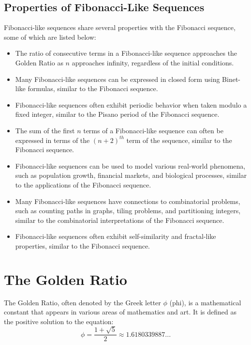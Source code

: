 \documentclass[openany]{book}
\begin{document}
\subsection{Properties of Fibonacci-Like Sequences}
Fibonacci-like sequences share several properties with the Fibonacci sequence, some of which are listed below:
\begin{itemize}
    \item The ratio of consecutive terms in a Fibonacci-like sequence approaches the Golden Ratio as $n$ approaches infinity, regardless of the initial conditions.
    \item Many Fibonacci-like sequences can be expressed in closed form using Binet-like formulas, similar to the Fibonacci sequence.
    \item Fibonacci-like sequences often exhibit periodic behavior when taken modulo a fixed integer, similar to the Pisano period of the Fibonacci sequence.
    \item The sum of the first $n$ terms of a Fibonacci-like sequence can often be expressed in terms of the $(n+2)^{th}$ term of the sequence, similar to the Fibonacci sequence.
    \item Fibonacci-like sequences can be used to model various real-world phenomena, such as population growth, financial markets, and biological processes, similar to the applications of the Fibonacci sequence.
    \item Many Fibonacci-like sequences have connections to combinatorial problems, such as counting paths in graphs, tiling problems, and partitioning integers, similar to the combinatorial interpretations of the Fibonacci sequence.
    \item Fibonacci-like sequences often exhibit self-similarity and fractal-like properties, similar to the Fibonacci sequence.
\end{itemize}



\section{The Golden Ratio}
The Golden Ratio, often denoted by the Greek letter $\phi$ (phi), is a mathematical constant that appears in various areas of mathematics and art. It is defined as the positive solution to the equation:
\[    \phi = \frac{1 + \sqrt{5}}{2} \approx 1.6180339887... 
\]
\end{document}
